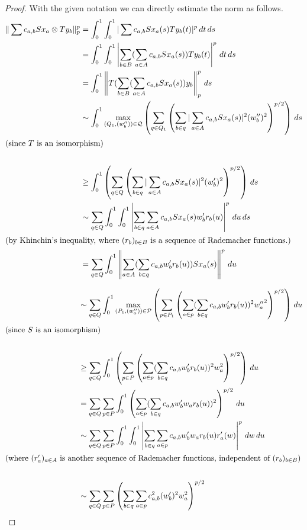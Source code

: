 \documentclass[12pt]{amsart}
\theoremstyle{definition}
\theoremstyle{remark}
\numberwithin{equation}{section}
\begin{document}
\begin{proof} With the given notation we can directly estimate the norm as
follows.
\[
\begin{split}
 \|\sum c_{a,b} Sx_a \otimes Ty_b\|^p_p 
&= \int_0^1 \int_0^1 |\sum
c_{a,b} Sx_a(s)Ty_b(t)|^p\, dt\, ds\\
&= \int_0^1 \int_0^1 \left|\sum_{b\in B} (\sum_{a\in A} c_{a,b}
Sx_a(s))Ty_b(t)\right|^p\, dt\, ds \\
&=\int_0^1 \left\|T(\sum_{b\in B} (\sum_{a\in A} c_{a,b} 
Sx_a(s))y_b\right\|^p_p \, ds\, \\
& \sim \int_0^1 \max_{(Q_1,(w_b''))\in \mathcal Q} \left(\sum_{q\in
Q_1}\left(\sum_{b\in q}
|\sum_{a\in A} c_{a,b} Sx_a(s)|^2 (w''_b)^2\right)^{p/2}\right)\, ds\\
\intertext{(since $T$ is an isomorphism)}\\
&\ge \int_0^1  \left(\sum_{q\in Q}\left(\sum_{b\in q}
|\sum_{a\in A} c_{a,b} Sx_a(s)|^2 (w'_b)^2\right)^{p/2}\right)\, ds\\
&\sim   \sum_{q\in Q} \int_0^1 \int_0^1 \left|\sum_{b\in
q}\sum_{a\in A} c_{a,b} Sx_a(s)w'_b r_b(u)\right|^p\,du \, ds \\
\intertext{(by Khinchin's inequality, where $(r_b)_{b\in B}$ is a sequence
of Rademacher functions.)}
&=   \sum_{q\in Q} \int_0^1 \left \|\sum_{a\in
A}(\sum_{b\in q}  c_{a,b}w'_b r_b(u))Sx_a(s)\right\|^p\,du \\
\end{split}
\]

\[
\begin{split}\hphantom{ \|\sum c_{a,b} Sx_a \otimes Ty_b\|^p}
&\sim \sum_{q\in Q} \int_0^1 \max_{(P_1,(w_a''))\in \mathcal P} \left( \sum_{p\in P_1}
\left(\sum_{a\in p}(\sum_{b\in q}  c_{a,b}w'_b
r_b(u))^2{w_a''}^2\right)^{p/2}\right)\,du \\
\intertext{(since $S$ is an isomorphism)}\\
&\ge \sum_{q\in Q} \int_0^1 \left( \sum_{p\in P}
\left(\sum_{a\in p}(\sum_{b\in q}  c_{a,b}w'_b
r_b(u))^2w_a^2\right)^{p/2}\right)\,du \\
&= \sum_{q\in Q} \sum_{p\in P}\int_0^1\left(\sum_{a\in
p}(\sum_{b\in q}  c_{a,b}w'_b w_a 
r_b(u))^2\right)^{p/2}\,du \\
&\sim  \sum_{q\in Q} \sum_{p\in
P}\int_0^1\int_0^1\left|\sum_{b\in q}\sum_{a\in 
p}c_{a,b}w'_b w_a r_b(u)r'_a(w)\right |^p\,dw\,du\\
\intertext{(where $(r'_a)_{a\in A}$ is another  sequence of Rademacher
functions, independent of $(r_b)_{b\in B}$)}\\
&\sim  \sum_{q\in Q} \sum_{p\in
P}\left(\sum_{b\in q}\sum_{a\in  
p}c_{a,b}^2(w'_b)^2 w_a^2\right)^{p/2}
\end{split}
\]
\end{proof}
\end{document}
